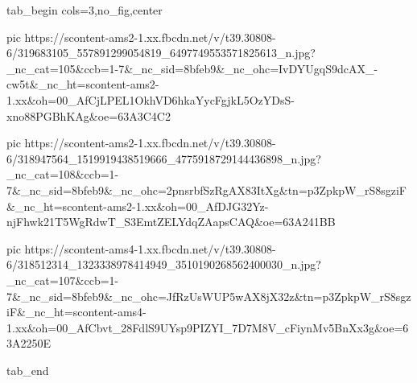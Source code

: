  
 
 
 
 


\ifcmt
  tab_begin cols=3,no_fig,center

     pic https://scontent-ams2-1.xx.fbcdn.net/v/t39.30808-6/319683105_557891299054819_6497749553571825613_n.jpg?_nc_cat=105&ccb=1-7&_nc_sid=8bfeb9&_nc_ohc=IvDYUgqS9dcAX_-cw5t&_nc_ht=scontent-ams2-1.xx&oh=00_AfCjLPEL1OkhVD6hkaYycFgjkL5OzYDsS-xno88PGBhKAg&oe=63A3C4C2

     pic https://scontent-ams2-1.xx.fbcdn.net/v/t39.30808-6/318947564_1519919438519666_4775918729144436898_n.jpg?_nc_cat=108&ccb=1-7&_nc_sid=8bfeb9&_nc_ohc=2pnsrbfSzRgAX83ItXg&tn=p3ZpkpW_rS8sgziF&_nc_ht=scontent-ams2-1.xx&oh=00_AfDJG32Yz-njFhwk21T5WgRdwT_S3EmtZELYdqZAapsCAQ&oe=63A241BB

     pic https://scontent-ams4-1.xx.fbcdn.net/v/t39.30808-6/318512314_1323338978414949_3510190268562400030_n.jpg?_nc_cat=107&ccb=1-7&_nc_sid=8bfeb9&_nc_ohc=JfRzUsWUP5wAX8jX32z&tn=p3ZpkpW_rS8sgziF&_nc_ht=scontent-ams4-1.xx&oh=00_AfCbvt_28FdlS9UYsp9PIZYI_7D7M8V_cFiynMv5BnXx3g&oe=63A2250E

  tab_end
\fi
